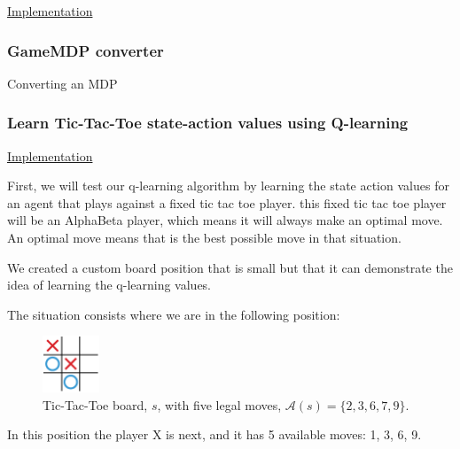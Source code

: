 \documentclass{article}
\newcommand{\GithubURL}[2]{
\noindent
\href{https://github.com/davidrobles/mlnd-capstone-code/blob/master/#1}{#2}
\break
}
\begin{document}
\GithubURL{capstone/game/tictactoe.py}{Implementation}



\subsubsection{GameMDP converter}

Converting an MDP

\subsubsection{Learn Tic-Tac-Toe state-action values using Q-learning}


\GithubURL{examples/tictactoe_qlearning_values.py}{Implementation}

First, we will test our q-learning algorithm by learning the state action values for an agent that
plays against a fixed tic tac toe player. this fixed tic tac toe player will be an AlphaBeta player,
which means it will always make an optimal move. An optimal move means that is the best possible
move in that situation.

We created a custom board position that is small but that it can demonstrate the idea of learning
the q-learning values.

The situation consists where we are in the following position:


\begin{figure}[!h]
    \centering
    \includegraphics[width=0.15\textwidth]{figures/tic_ql_current.pdf}
    \caption{Tic-Tac-Toe board, $s$, with five legal moves, $\mathcal{A}(s) = \{2, 3, 6, 7, 9\}$.}
    \label{fig:tic-play32}
\end{figure}

In this position the player X is next, and it has 5 available moves: 1, 3, 6, 9.

\end{document}
